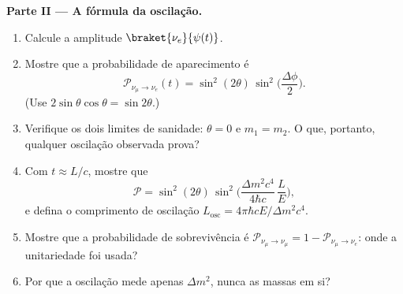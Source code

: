 \begin{problem}
\medskip\noindent\textbf{Parte II --- A fórmula da oscilação.}
\begin{enumerate}[resume]
  \item Calcule a amplitude $\braket{\nu_e}{\psi(t)}$.
  \item Mostre que a probabilidade de aparecimento é
        \[
        \mathcal P_{\nu_\mu \to \nu_e}(t) =
        \sin^2(2\theta)\,\sin^2\Big(\frac{\Delta\phi}{2}\Big) .
        \]
        (Use $2\sin\theta\cos\theta = \sin2\theta$.)
  \item Verifique os dois limites de sanidade: $\theta = 0$ e
        $m_1 = m_2$. O que, portanto, qualquer oscilação observada
        prova?
  \item Com $t \approx L/c$, mostre que
        \[
        \mathcal P = \sin^2(2\theta)\,
        \sin^2\Big(\frac{\Delta m^2c^4}{4\hbar c}\,\frac{L}{E}\Big) ,
        \]
        e defina o comprimento de oscilação $L_{\text{osc}} =
        4\pi\hbar cE/\Delta m^2c^4$.
  \item Mostre que a probabilidade de sobrevivência é
        $\mathcal P_{\nu_\mu \to
        \nu_\mu} = 1 - \mathcal P_{\nu_\mu\to\nu_e}$: onde a
        unitariedade foi usada?
  \item Por que a oscilação mede apenas $\Delta m^2$, nunca as massas
        em si?
\end{enumerate}


\end{problem}
